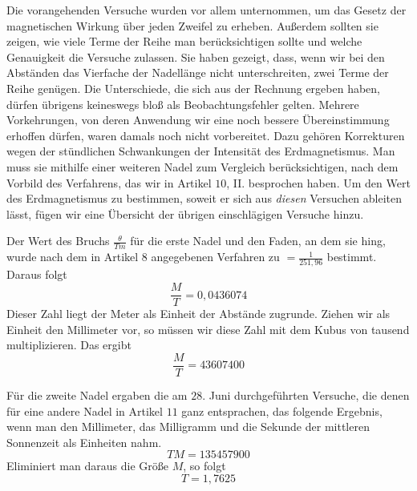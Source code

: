 Die vorangehenden Versuche wurden vor allem unternommen, um das Gesetz der magnetischen Wirkung über jeden Zweifel zu erheben. Außerdem sollten sie zeigen, wie viele Terme der Reihe man berücksichtigen sollte und welche Genauigkeit die Versuche zulassen. Sie haben gezeigt, dass, wenn wir bei den Abständen das Vierfache der Nadellänge nicht unterschreiten, zwei Terme der Reihe genügen. Die Unterschiede, die sich aus der Rechnung ergeben haben, dürfen übrigens keineswegs bloß als Beobachtungsfehler gelten. Mehrere Vorkehrungen, von deren Anwendung wir eine noch bessere Übereinstimmung erhoffen dürfen, waren damals noch nicht vorbereitet. Dazu gehören Korrekturen wegen der stündlichen Schwankungen der Intensität des Erdmagnetismus. Man muss sie mithilfe einer weiteren Nadel zum Vergleich berücksichtigen, nach dem Vorbild des Verfahrens, das wir in Artikel $10$, II. besprochen haben. Um den Wert des Erdmagnetismus zu bestimmen, soweit er sich aus \textit{diesen} Versuchen ableiten lässt, fügen wir eine Übersicht der übrigen einschlägigen Versuche hinzu.

Der Wert des Bruchs $\frac{\theta}{Tm}$ für die erste Nadel und den Faden, an dem sie hing, wurde nach dem in Artikel $8$ angegebenen Verfahren zu $=\frac{1}{251{,}96}$ bestimmt. Daraus folgt
\[
\frac MT=0{,}0436074
\]
Dieser Zahl liegt der Meter als Einheit der Abstände zugrunde. Ziehen wir als Einheit den Millimeter vor, so müssen wir diese Zahl mit dem Kubus von tausend multiplizieren. Das ergibt
\[
\frac MT=43607400
\]

Für die zweite Nadel ergaben die am $28$. Juni durchgeführten Versuche, die denen für eine andere Nadel in Artikel $11$ ganz entsprachen, das folgende Ergebnis, wenn man den Millimeter, das Milligramm und die Sekunde der mittleren Sonnenzeit als Einheiten nahm.
\[
TM=135457900
\]
Eliminiert man daraus die Größe $M$, so folgt
\[
T=1{,}7625
\]
